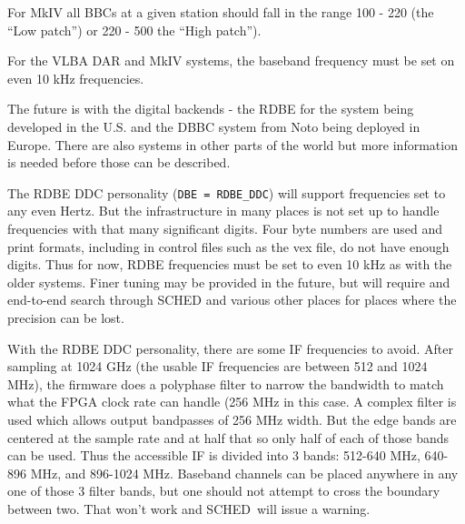 \documentclass{report}
\newcommand{\schedb}{{\sc SCHED~}}
\begin{document}
For MkIV all BBCs at a given station should fall in the range 100 -
220 (the ``Low patch'') or 220 - 500 the ``High patch'').

For the VLBA DAR and MkIV systems, the baseband frequency must be set
on even 10 kHz frequencies.

The future is with the digital backends - the RDBE for the system
being developed in the U.S. and the DBBC system from Noto being deployed
in Europe.  There are also systems in other parts of the world but
more information is needed before those can be described.

The RDBE DDC personality ({\tt DBE = RDBE\_DDC}) will support
frequencies set to any even Hertz.  But the infrastructure in many
places is not set up to handle frequencies with that many significant
digits.  Four byte numbers are used and print formats, including in
control files such as the vex file, do not have enough digits.  Thus
for now, RDBE frequencies must be set to even 10 kHz as with the older
systems.  Finer tuning may be provided in the future, but will require
and end-to-end search through SCHED and various other places for
places where the precision can be lost.

With the RDBE DDC personality, there are some IF frequencies to avoid.
After sampling at 1024 GHz (the usable IF frequencies are between 512
and 1024 MHz), the firmware does a polyphase filter to narrow the
bandwidth to match what the FPGA clock rate can handle (256 MHz in
this case.  A complex filter is used which allows output bandpasses of
256 MHz width.  But the edge bands are centered at the sample rate and
at half that so only half of each of those bands can be used.  Thus
the accessible IF is divided into 3 bands: 512-640 MHz, 640-896 MHz,
and 896-1024 MHz.  Baseband channels can be placed anywhere in any one
of those 3 filter bands, but one should not attempt to cross the
boundary between two.  That won't work and \schedb will issue a warning.
\end{document}
